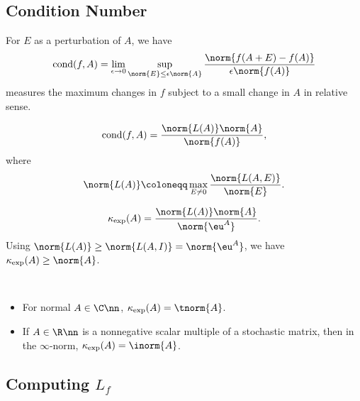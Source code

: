 \documentclass{article}
\def\cond{\mathrm{cond}}
\begin{document}
\subsection{Condition Number}

For $E$ as a perturbation of $A$, we have 
\begin{equation}\notag
    \cond(f,A) = \lim_{\epsilon \to 0}\sup_{\norm{E} \leq \epsilon \norm{A}} 
    \frac{\norm{f(A +E) - f(A)}}{\epsilon \norm{f(A)}}
\end{equation}
measures the maximum changes in $f$ subject to a small change in $A$ in
relative sense.

\begin{lemma}
    \begin{equation}\notag
        \cond(f,A) = \frac{\norm{L(A)}\norm{A}}{\norm{f(A)}},
    \end{equation}
    where 
    \begin{equation}\notag
        \norm{L(A)} \coloneqq \max_{E\neq 0} \frac{\norm{L(A,E)}}{\norm{E}}.
    \end{equation}
\end{lemma}

\begin{example}
    \begin{equation}\notag
        \kappa_{\exp}(A) = \frac{\norm{L(A)}\norm{A}}{\norm{\eu^A}}.
    \end{equation}
    Using $\norm{L(A)} \geq \norm{L(A,I)} = \norm{\eu^A}$, we have
    $\kappa_{\exp}(A) \geq \norm{A}$.
\end{example}

\begin{theorem}
    \ 
    \begin{itemize}
        \item For normal $A\in\C\nn$, $\kappa_{\exp}(A) = \tnorm{A}$.
        \item If $A\in\R\nn$ is a nonnegative scalar multiple of a
        stochastic matrix, then in the $\infty$-norm, $\kappa_{\exp}(A)
        = \inorm{A}$.
    \end{itemize}
\end{theorem}


\subsection{Computing $L_f$}
\end{document}
